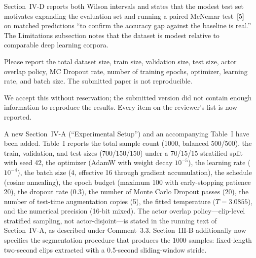 \begin{changesblock}
Section~IV-D reports both Wilson intervals and states that the
modest test set motivates expanding the evaluation set and running a
paired McNemar test~[5] on matched predictions ``to confirm
the accuracy gap against the baseline is real.'' The Limitations
subsection notes that the dataset is modest relative to comparable
deep learning corpora.
\end{changesblock}


\begin{reviewercomment}
Please report the total dataset size, train size, validation size, test
size, actor overlap policy, MC Dropout rate, number of training epochs,
optimizer, learning rate, and batch size. The submitted paper is not
reproducible.
\end{reviewercomment}

\response We accept this without reservation; the submitted version did
not contain enough information to reproduce the results. Every item on
the reviewer's list is now reported.

\begin{changesblock}
A new Section~IV-A (``Experimental Setup'') and an accompanying
Table~I have been added. Table~I reports the total sample count (1000,
balanced 500/500), the train, validation, and test sizes (700/150/150)
under a 70/15/15 stratified split with seed 42, the optimizer (AdamW with
weight decay $10^{-5}$), the learning rate ($10^{-4}$), the batch size (4,
effective 16 through gradient accumulation), the schedule (cosine
annealing), the epoch budget (maximum 100 with early-stopping patience
20), the dropout rate (0.3), the number of Monte Carlo Dropout passes
(20), the number of test-time augmentation copies (5), the fitted
temperature ($T = 3.0855$), and the numerical precision (16-bit mixed).
The actor overlap policy---clip-level stratified sampling, not
actor-disjoint---is stated in the running text of Section~IV-A, as
described under Comment~3.3. Section~III-B additionally now specifies the
segmentation procedure that produces the 1000 samples: fixed-length
two-second clips extracted with a 0.5-second sliding-window stride.
\end{changesblock}


